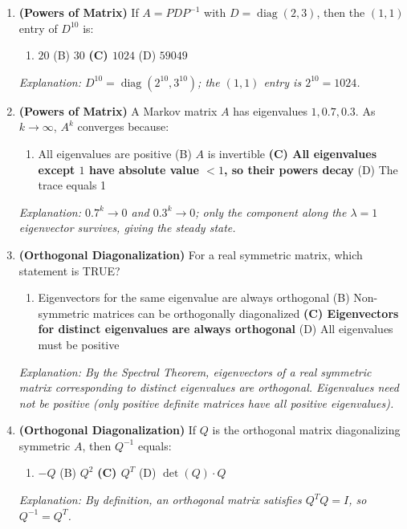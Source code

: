 \documentclass[12pt,a4paper]{article}
\begin{document}
\begin{enumerate}[leftmargin=*, label=\textbf{MCQ\arabic*.}]
  \item \textbf{(Powers of Matrix)} If $A = PDP^{-1}$ with $D = \operatorname{diag}(2, 3)$, then the $(1,1)$ entry of $D^{10}$ is:
  \begin{enumerate}[label=(\Alph*)]
    \item $20$ \quad (B) $30$ \quad \textbf{(C) $1024$} \quad (D) $59049$
  \end{enumerate}
  \textit{Explanation: $D^{10} = \operatorname{diag}(2^{10}, 3^{10})$; the $(1,1)$ entry is $2^{10} = 1024$.}

  \item \textbf{(Powers of Matrix)} A Markov matrix $A$ has eigenvalues $1, 0.7, 0.3$. As $k\to\infty$, $A^k$ converges because:
  \begin{enumerate}[label=(\Alph*)]
    \item All eigenvalues are positive \quad (B) $A$ is invertible \quad \textbf{(C) All eigenvalues except $1$ have absolute value $<1$, so their powers decay} \quad (D) The trace equals 1
  \end{enumerate}
  \textit{Explanation: $0.7^k\to0$ and $0.3^k\to0$; only the component along the $\lambda=1$ eigenvector survives, giving the steady state.}

  \item \textbf{(Orthogonal Diagonalization)} For a real symmetric matrix, which statement is TRUE?
  \begin{enumerate}[label=(\Alph*)]
    \item Eigenvectors for the same eigenvalue are always orthogonal \quad (B) Non-symmetric matrices can be orthogonally diagonalized \quad \textbf{(C) Eigenvectors for distinct eigenvalues are always orthogonal} \quad (D) All eigenvalues must be positive
  \end{enumerate}
  \textit{Explanation: By the Spectral Theorem, eigenvectors of a real symmetric matrix corresponding to distinct eigenvalues are orthogonal. Eigenvalues need not be positive (only positive definite matrices have all positive eigenvalues).}

  \item \textbf{(Orthogonal Diagonalization)} If $Q$ is the orthogonal matrix diagonalizing symmetric $A$, then $Q^{-1}$ equals:
  \begin{enumerate}[label=(\Alph*)]
    \item $-Q$ \quad (B) $Q^2$ \quad \textbf{(C) $Q^T$} \quad (D) $\det(Q)\cdot Q$
  \end{enumerate}
  \textit{Explanation: By definition, an orthogonal matrix satisfies $Q^TQ = I$, so $Q^{-1} = Q^T$.}
\end{enumerate}
\end{document}
